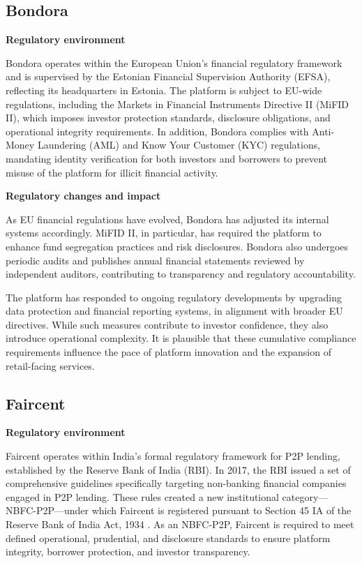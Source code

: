 \documentclass[pdflatex,sn-apa]{sn-jnl}%
\theoremstyle{thmstyleone}%
\theoremstyle{thmstyletwo}%
\theoremstyle{thmstylethree}%
\begin{document}
\subsection{Bondora}

\textbf{Regulatory environment} 

Bondora operates within the European Union's financial regulatory framework and is supervised by the Estonian Financial Supervision Authority (EFSA), reflecting its headquarters in Estonia. The platform is subject to EU-wide regulations, including the Markets in Financial Instruments Directive II (MiFID II), which imposes investor protection standards, disclosure obligations, and operational integrity requirements. In addition, Bondora complies with Anti-Money Laundering (AML) and Know Your Customer (KYC) regulations, mandating identity verification for both investors and borrowers to prevent misuse of the platform for illicit financial activity.

\textbf{Regulatory changes and impact} 

As EU financial regulations have evolved, Bondora has adjusted its internal systems accordingly. MiFID II, in particular, has required the platform to enhance fund segregation practices and risk disclosures. Bondora also undergoes periodic audits and publishes annual financial statements reviewed by independent auditors, contributing to transparency and regulatory accountability.

The platform has responded to ongoing regulatory developments by upgrading data protection and financial reporting systems, in alignment with broader EU directives. While such measures contribute to investor confidence, they also introduce operational complexity. It is plausible that these cumulative compliance requirements influence the pace of platform innovation and the expansion of retail-facing services.

\subsection{Faircent}

\textbf{Regulatory environment}

Faircent operates within India’s formal regulatory framework for P2P lending, established by the Reserve Bank of India (RBI). In 2017, the RBI issued a set of comprehensive guidelines specifically targeting non-banking financial companies engaged in P2P lending. These rules created a new institutional category—NBFC-P2P—under which Faircent is registered pursuant to Section 45 IA of the Reserve Bank of India Act, 1934 \citep{rbi_non-banking_2017}. As an NBFC-P2P, Faircent is required to meet defined operational, prudential, and disclosure standards to ensure platform integrity, borrower protection, and investor transparency.
\end{document}
